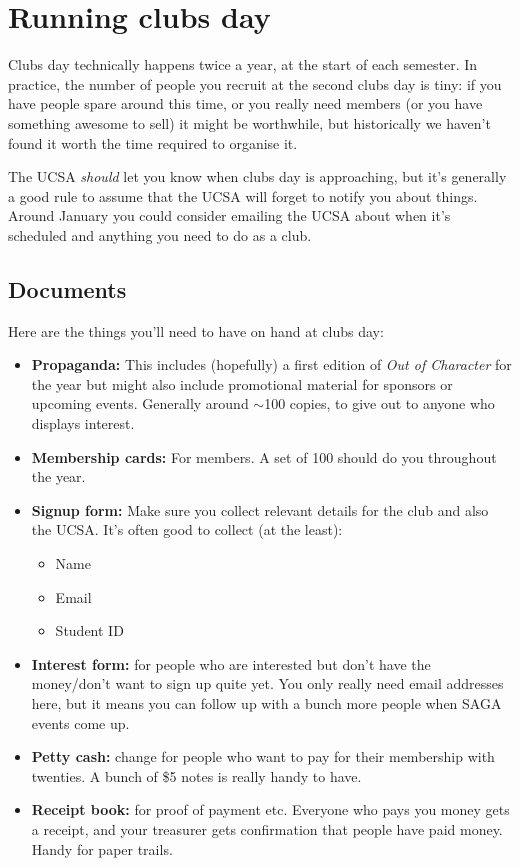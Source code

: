 \section{Running clubs day}
\label{sec:clubs_day}

Clubs day technically happens twice a year, at the start of each semester. In practice, the number of people you recruit at the second clubs day is tiny: if you have people spare around this time, or you really need members (or you have something awesome to sell) it might be worthwhile, but historically we haven't found it worth the time required to organise it.

The UCSA \textit{should} let you know when clubs day is approaching, but it's generally a good rule to assume that the UCSA will forget to notify you about things. Around January you could consider emailing the UCSA about when it's scheduled and anything you need to do as a club.

\subsection{Documents}

Here are the things you'll need to have on hand at clubs day:

\begin{itemize}
  \item \textbf{Propaganda:} This includes (hopefully) a first edition of \textit{Out of Character} for the year but might also include promotional material for sponsors or upcoming events. Generally around $\sim$100 copies, to give out to anyone who displays interest.
  \item \textbf{Membership cards:} For members. A set of 100 should do you throughout the year.
  \item \textbf{Signup form:} Make sure you collect relevant details for the club and also the UCSA. It's often good to collect (at the least):
    \begin{itemize}
      \item Name
      \item Email
      \item Student ID
    \end{itemize}
    \item \textbf{Interest form:} for people who are interested but don't have the money/don't want to sign up quite yet. You only really need email addresses here, but it means you can follow up with a bunch more people when SAGA events come up.
    \item \textbf{Petty cash:} change for people who want to pay for their membership with twenties. A bunch of \$5 notes is really handy to have.
    \item \textbf{Receipt book:} for proof of payment etc. Everyone who pays you money gets a receipt, and your treasurer gets confirmation that people have paid money. Handy for paper trails.
\end{itemize}

